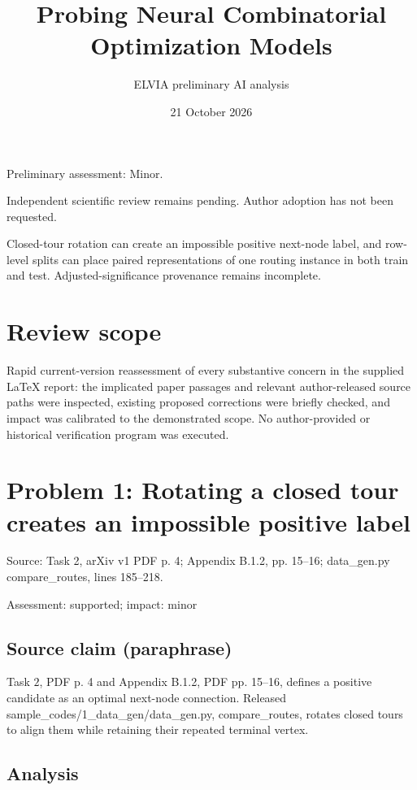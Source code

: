 \documentclass[11pt]{article}
\begin{document}
\title{Probing Neural Combinatorial Optimization Models}

\author{ELVIA preliminary AI analysis}\date{21 October 2026}\maketitle

Preliminary assessment: Minor.\par

Independent scientific review remains pending. Author adoption has not been requested.

Closed-tour rotation can create an impossible positive next-node label, and row-level splits can place paired representations of one routing instance in both train and test. Adjusted-significance provenance remains incomplete.

\section*{Review scope}

Rapid current-version reassessment of every substantive concern in the supplied LaTeX report: the implicated paper passages and relevant author-released source paths were inspected, existing proposed corrections were briefly checked, and impact was calibrated to the demonstrated scope. No author-provided or historical verification program was executed.

\section*{Problem 1: Rotating a closed tour creates an impossible positive label}

Source: Task 2, arXiv v1 PDF p. 4; Appendix B.1.2, pp. 15–16; data\_gen.py compare\_routes, lines 185–218.

Assessment: supported; impact: minor

\subsection*{Source claim (paraphrase)}

Task \(2\), PDF p. 4 and Appendix B.1.2, PDF pp. 15–16, defines a positive candidate as an optimal next-node connection. Released sample\_codes/1\_data\_gen/data\_gen.py, compare\_routes, rotates closed tours to align them while retaining their repeated terminal vertex.

\subsection*{Analysis}
\end{document}
